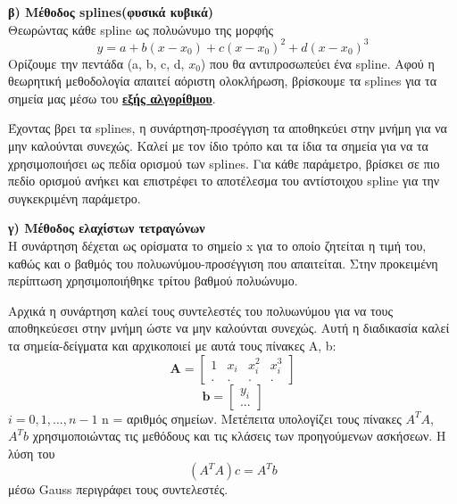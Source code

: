 \documentclass{article}
\newcommand{\lt}{\latintext}
\newcommand{\gt}{\greektext}
\begin{document}
\textbf{\gt β) Μέθοδος \lt splines\gt (φυσικά κυβικά)}\\
\gt Θεωρώντας κάθε \lt spline \gt ως πολυώνυμο της μορφής
\begin{equation*}
    y = a + b(x - x_0) + c(x - x_0)^2 + d(x - x_0)^3
\end{equation*}
\gt Ορίζουμε την πεντάδα \lt(a, b, c, d, $x_0$) \gt που θα αντιπροσωπεύει ένα \lt spline.
\gt Αφού η θεωρητική μεθοδολογία απαιτεί αόριστη ολοκλήρωση, βρίσκουμε τα \lt splines
\gt για τα σημεία μας μέσω του \href{https://en.wikipedia.org/wiki/Spline_(mathematics)}{\textbf{\gt εξής αλγορίθμου}}.

\gt Έχοντας βρει τα \lt splines, \gt η συνάρτηση-προσέγγιση τα αποθηκεύει στην μνήμη για να μην
\gt καλούνται συνεχώς. Καλεί με τον ίδιο τρόπο και τα ίδια τα σημεία για να τα χρησιμοποιήσει ως 
\gt πεδία ορισμού των \lt splines. \gt Για κάθε παράμετρο, βρίσκει σε πιο πεδίο ορισμού ανήκει και
\gt επιστρέφει το αποτέλεσμα του αντίστοιχου \lt spline \gt για την συγκεκριμένη παράμετρο.

\textbf{\gt γ) Μέθοδος ελαχίστων τετραγώνων}\\
\gt Η συνάρτηση δέχεται ως ορίσματα το σημείο \lt x \gt για το οποίο ζητείται η τιμή του,
\gt καθώς και ο βαθμός του πολυωνύμου-προσέγγιση που απαιτείται. Στην προκειμένη περίπτωση
\gt χρησιμοποιήθηκε τρίτου βαθμού πολυώνυμο.

\gt Αρχικά η συνάρτηση καλεί τους συντελεστές του πολυωνύμου για να τους αποθηκεύεσει στην
\gt μνήμη ώστε να μην καλούνται συνεχώς. Αυτή η διαδικασία καλεί τα σημεία-δείγματα και αρχικοποιεί
\gt με αυτά τους πίνακες \lt A, b:
\begin{equation*}
    \textbf{A} = 
    \begin{bmatrix}
         1 & x_{i} & x_{i}^2 & x_{i}^3\\
         .& . & . & .
    \end{bmatrix}
\end{equation*}
\begin{equation*}
    \textbf{b} = 
    \begin{bmatrix}
         y_i\\
         ...
    \end{bmatrix}
\end{equation*}
$ i = 0, 1, ..., n - 1 $ \quad n = \gt αριθμός σημείων. 
\gt Μετέπειτα υπολογίζει τους πίνακες \lt $A^{T}A$, $A^{T}b$ \gt χρησιμοποιώντας τις μεθόδους
\gt και τις κλάσεις των προηγούμενων ασκήσεων. Η λύση του
\begin{equation*}
    (A^{T}A)c = A^{T}b
\end{equation*} 
\gt μέσω \lt Gauss \gt περιγράφει τους συντελεστές.
\end{document}
